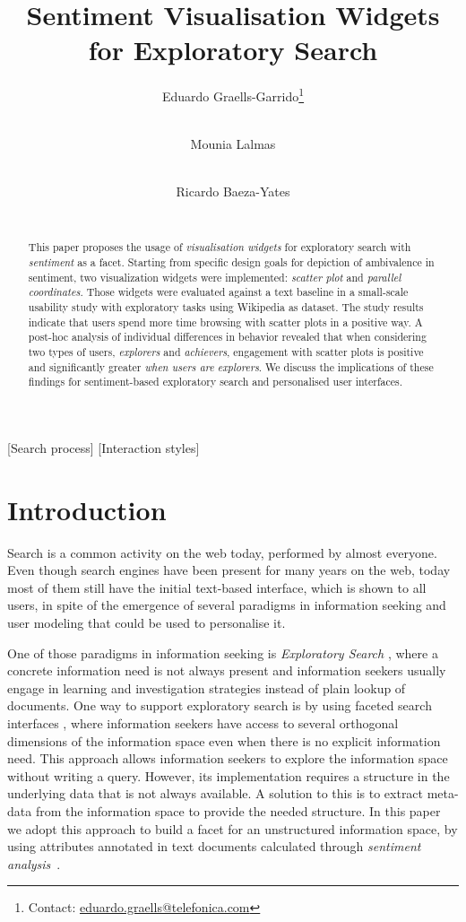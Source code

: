 \documentclass{sig-alternate}
\author{
Eduardo Graells-Garrido\thanks{Contact: \url{eduardo.graells@telefonica.com}} \\
\affaddr{Universitat Pompeu Fabra} \\
\affaddr{Barcelona, Spain} \and
Mounia Lalmas \\
\affaddr{Yahoo Labs} \\
\affaddr{London, UK} \and
Ricardo Baeza-Yates \\
\affaddr{Yahoo Labs} \\
\affaddr{Barcelona, Spain}
}
\title{Sentiment Visualisation Widgets for Exploratory Search}
\begin{document}
\maketitle

\begin{abstract}
This paper proposes the usage of \emph{visualisation widgets} for exploratory search with \emph{sentiment} as a facet. 
Starting from specific design goals for depiction of ambivalence in sentiment, two visualization widgets were implemented: \emph{scatter plot} and \emph{parallel coordinates}.
Those widgets were evaluated against a text baseline in a small-scale usability study with exploratory tasks using Wikipedia as dataset. 
The study results indicate that users spend more time browsing with scatter plots in a positive way. 
A post-hoc analysis of individual differences in behavior revealed that when considering two types of users, \emph{explorers} and \emph{achievers}, engagement with scatter plots is positive and significantly greater \textit{when users are explorers}.
We discuss the implications of these findings for sentiment-based exploratory search and personalised user interfaces.
\end{abstract}

[Search process]
[Interaction styles]

\section{Introduction}
Search is a common activity on the web today, performed by almost everyone. 
Even though search  engines have been present for many years on the web, today most of them still have the initial text-based interface, which is shown to all users, in spite of the emergence of several paradigms in information seeking and user modeling that could be used to personalise it. 

One of those paradigms in information seeking is \emph{Exploratory Search} \cite{marchionini2006exploratory}, where a concrete information need is not always present and information seekers usually engage in learning and investigation strategies instead of plain lookup of documents.
One way to support exploratory search is by using faceted search interfaces \cite{hearst2009search}, where information seekers have access to several orthogonal dimensions of the information space even when there is no explicit information need. 
This approach allows information seekers to explore the information space without writing a query. 
However, its implementation requires a structure in the underlying data that is not always available.
A solution to this is to extract meta-data from the information space to provide the needed structure. 
In this paper we adopt this approach to build a facet for an unstructured information space, by using attributes annotated in text documents calculated through \emph{sentiment analysis}~\cite{pang2008opinion}. 
\end{document}
